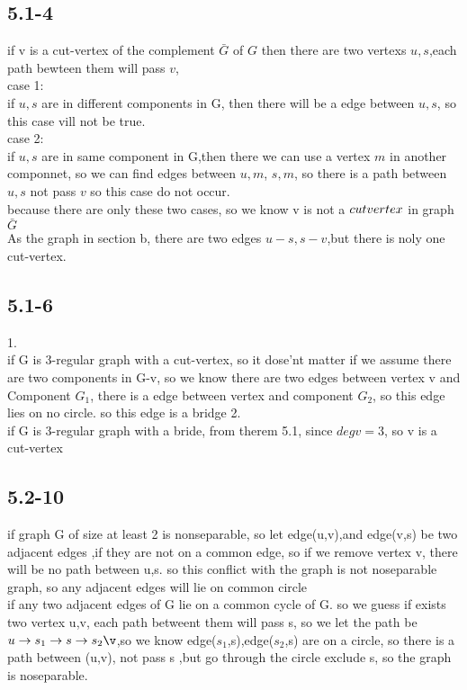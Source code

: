 \documentclass[a4paper,UTF8]{article}
\theoremstyle{definition}
\begin{document}
\subsection*{5.1-4}
if v is  a cut-vertex of the complement $\bar{G}$ of $G$
then there are two vertexs $u,s$,each path bewteen them will pass $v$,\\
case 1:\\
 if $u,s$ are in different components in G, then there will be a edge between $u,s$,
so this case vill not be true.\\
case 2:\\
if $u,s$ are in same component in G,then there we can use a vertex $m$ in another componnet,
so we can  find   edges between  $u,m$, $s,m$, so there is a path between $u,s$ not pass $v$
so this case do not occur.\\
because there are only these two cases, so we know v is not a $cut\-vertex$ in graph $\bar{G}$ \\
As the graph in section b, there are two edges $u-s,s-v$,but there is noly one cut-vertex.
\subsection*{5.1-6}
1.\\
if G is 3-regular graph with a cut-vertex, so it dose'nt matter if we assume there are two components
in G-v, so we know there are two edges between vertex v and Component $G_1$, there is a edge between vertex and component
$G_2$, so this edge lies on no circle. so this edge is a bridge
2.\\
if G is 3-regular graph with a bride, from therem 5.1, since $deg v=3$, so v is a cut-vertex
\subsection*{5.2-10}
if graph G of size at least 2 is nonseparable, so let edge(u,v),and edge(v,s) be two adjacent edges ,if they are not on a common edge,
so if we remove vertex v, there will be no path between u,s. so this conflict with the graph is not noseparable graph, so any adjacent edges will lie
on common circle\\
if  any two adjacent edges of G lie on a common cycle of G. so we guess if exists two vertex u,v, each path betweent them will pass s, so we let the path be
$u\to s_1 \to s \to s_2 \v$,so we know edge($s_1$,s),edge($s_2$,s) are on a circle,
so there is a path between (u,v), not pass s ,but go through the circle exclude s, so the graph is noseparable.
\end{document}
